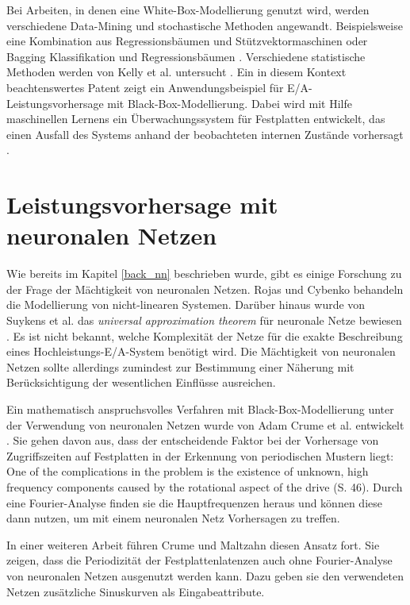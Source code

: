 \documentclass[
	12pt,
	a4paper,
	BCOR10mm,
	DIV14,
	listof=totoc,
	bibliography=totoc,
	headsepline
]{scrreprt}
\begin{document}
Bei Arbeiten, in denen eine White-Box-Modellierung genutzt wird, werden verschiedene Data-Mining und stochastische Methoden angewandt. Beispielsweise eine Kombination aus Regressionsbäumen und Stützvektormaschinen \cite{Dai:2012:SDP:2477169.2477214} oder Bagging Klassifikation und Regressionsbäumen \cite{DBLP:conf/npc/ZhangLZJC10}. Verschiedene statistische Methoden werden von Kelly et al. untersucht \cite{Kelly04inducingmodels}.
Ein in diesem Kontext beachtenswertes Patent zeigt ein Anwendungsbeispiel für E/A-Leistungsvorhersage mit Black-Box-Modellierung. Dabei wird mit Hilfe maschinellen Lernens ein Überwachungssystem für Festplatten entwickelt, das einen Ausfall des Systems anhand der beobachteten internen Zustände vorhersagt \cite{gough2012predicting}. 

\section{Leistungsvorhersage mit neuronalen Netzen}
\label{rel_vorhersage-mit-nn}
Wie bereits im Kapitel \ref{back_nn} beschrieben wurde, gibt es einige Forschung zu der Frage der Mächtigkeit von neuronalen Netzen. Rojas \cite{Rojas:1996:NNS:235222} und  Cybenko \cite{cybenko:mcss} behandeln die Modellierung von nicht-linearen Systemen. Darüber hinaus wurde von Suykens et al. das \textit{universal approximation theorem} für neuronale Netze bewiesen \cite{suykens2012artificial}. Es ist nicht bekannt, welche Komplexität der Netze für die exakte Beschreibung eines Hochleistungs-E/A-System benötigt wird. Die Mächtigkeit von neuronalen Netzen sollte allerdings zumindest zur Bestimmung einer Näherung mit Berücksichtigung der wesentlichen Einflüsse ausreichen.

Ein mathematisch anspruchsvolles Verfahren mit Black-Box-Modellierung unter der Verwendung von neuronalen Netzen wurde von Adam Crume et al. entwickelt \cite{Crume:2013:FML:2538542.2538561}. Sie gehen davon aus, dass der entscheidende Faktor bei der Vorhersage von Zugriffszeiten auf Festplatten in der Erkennung von periodischen Mustern liegt: \glqq One of the complications in the problem is the existence of unknown, high frequency components caused by the rotational aspect of the drive\grqq{} \cite{Crume:2013:FML:2538542.2538561} (S. 46).
Durch eine Fourier-Analyse finden sie die Hauptfrequenzen heraus und können diese dann nutzen, um mit einem neuronalen Netz Vorhersagen zu treffen.

In einer weiteren Arbeit führen Crume und Maltzahn diesen Ansatz fort. Sie zeigen, dass die Periodizität der Festplattenlatenzen auch ohne Fourier-Analyse von neuronalen Netzen ausgenutzt werden kann. Dazu geben sie den verwendeten Netzen zusätzliche Sinuskurven als Eingabeattribute. \cite{adamcrumecarlosmaltzahn2015}
\end{document}
